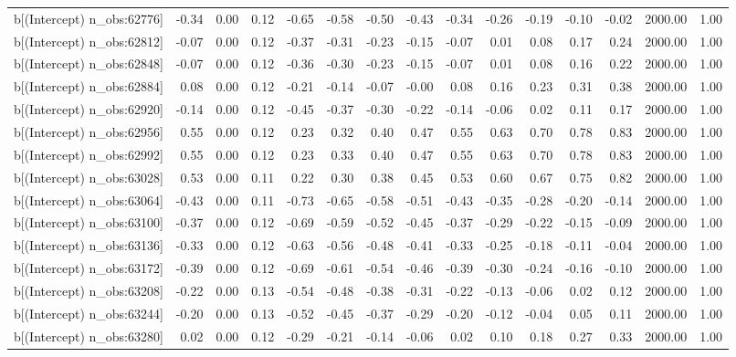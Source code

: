 \begin{table}[ht]
\begin{tabular}{rrrrrrrrrrrrrrr}
  b[(Intercept) n\_obs:62776] & -0.34 & 0.00 & 0.12 & -0.65 & -0.58 & -0.50 & -0.43 & -0.34 & -0.26 & -0.19 & -0.10 & -0.02 & 2000.00 & 1.00 \\ 
  b[(Intercept) n\_obs:62812] & -0.07 & 0.00 & 0.12 & -0.37 & -0.31 & -0.23 & -0.15 & -0.07 & 0.01 & 0.08 & 0.17 & 0.24 & 2000.00 & 1.00 \\ 
  b[(Intercept) n\_obs:62848] & -0.07 & 0.00 & 0.12 & -0.36 & -0.30 & -0.23 & -0.15 & -0.07 & 0.01 & 0.08 & 0.16 & 0.22 & 2000.00 & 1.00 \\ 
  b[(Intercept) n\_obs:62884] & 0.08 & 0.00 & 0.12 & -0.21 & -0.14 & -0.07 & -0.00 & 0.08 & 0.16 & 0.23 & 0.31 & 0.38 & 2000.00 & 1.00 \\ 
  b[(Intercept) n\_obs:62920] & -0.14 & 0.00 & 0.12 & -0.45 & -0.37 & -0.30 & -0.22 & -0.14 & -0.06 & 0.02 & 0.11 & 0.17 & 2000.00 & 1.00 \\ 
  b[(Intercept) n\_obs:62956] & 0.55 & 0.00 & 0.12 & 0.23 & 0.32 & 0.40 & 0.47 & 0.55 & 0.63 & 0.70 & 0.78 & 0.83 & 2000.00 & 1.00 \\ 
  b[(Intercept) n\_obs:62992] & 0.55 & 0.00 & 0.12 & 0.23 & 0.33 & 0.40 & 0.47 & 0.55 & 0.63 & 0.70 & 0.78 & 0.83 & 2000.00 & 1.00 \\ 
  b[(Intercept) n\_obs:63028] & 0.53 & 0.00 & 0.11 & 0.22 & 0.30 & 0.38 & 0.45 & 0.53 & 0.60 & 0.67 & 0.75 & 0.82 & 2000.00 & 1.00 \\ 
  b[(Intercept) n\_obs:63064] & -0.43 & 0.00 & 0.11 & -0.73 & -0.65 & -0.58 & -0.51 & -0.43 & -0.35 & -0.28 & -0.20 & -0.14 & 2000.00 & 1.00 \\ 
  b[(Intercept) n\_obs:63100] & -0.37 & 0.00 & 0.12 & -0.69 & -0.59 & -0.52 & -0.45 & -0.37 & -0.29 & -0.22 & -0.15 & -0.09 & 2000.00 & 1.00 \\ 
  b[(Intercept) n\_obs:63136] & -0.33 & 0.00 & 0.12 & -0.63 & -0.56 & -0.48 & -0.41 & -0.33 & -0.25 & -0.18 & -0.11 & -0.04 & 2000.00 & 1.00 \\ 
  b[(Intercept) n\_obs:63172] & -0.39 & 0.00 & 0.12 & -0.69 & -0.61 & -0.54 & -0.46 & -0.39 & -0.30 & -0.24 & -0.16 & -0.10 & 2000.00 & 1.00 \\ 
  b[(Intercept) n\_obs:63208] & -0.22 & 0.00 & 0.13 & -0.54 & -0.48 & -0.38 & -0.31 & -0.22 & -0.13 & -0.06 & 0.02 & 0.12 & 2000.00 & 1.00 \\ 
  b[(Intercept) n\_obs:63244] & -0.20 & 0.00 & 0.13 & -0.52 & -0.45 & -0.37 & -0.29 & -0.20 & -0.12 & -0.04 & 0.05 & 0.11 & 2000.00 & 1.00 \\ 
  b[(Intercept) n\_obs:63280] & 0.02 & 0.00 & 0.12 & -0.29 & -0.21 & -0.14 & -0.06 & 0.02 & 0.10 & 0.18 & 0.27 & 0.33 & 2000.00 & 1.00 \\ 

\end{tabular}
\end{table}
